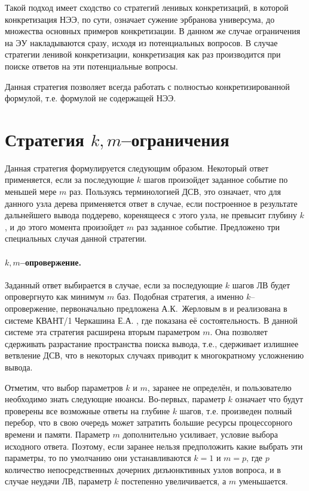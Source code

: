 Такой подход имеет сходство со стратегий ленивых конкретизаций, в которой конкретизация НЭЭ, по сути, означает сужение эрбранова универсума, до множества основных примеров конкретизации. В данном же случае ограничения на ЭУ накладываются сразу, исходя из потенциальных вопросов. В случае стратегии ленивой конкретизации, конкретизация как раз производится при поиске ответов на эти потенциальные вопросы.

Данная стратегия позволяет всегда работать с полностью конкретизированной формулой, т.е. формулой не содержащей НЭЭ.




\section{Стратегия $k,m$--ограничения}
Данная стратегия формулируется следующим образом. Некоторый ответ применяется, если за последующие $k$ шагов произойдет заданное событие по меньшей мере $m$ раз. Пользуясь терминологией ДСВ, это означает, что для данного узла дерева применяется ответ в случае, если построенное в результате дальнейшего вывода поддерево, коренящееся с этого узла, не превысит глубину $k$, и до этого момента произойдет $m$ раз заданное событие. Предложено три специальных случая данной стратегии.

\paragraph{$k,m$--опровержение.} Заданный ответ выбирается в случае, если за последующие $k$ шагов ЛВ будет опровергнуто как минимум $m$ баз. Подобная стратегия, а именно $k$--опровержение, первоначально предложена А.К.~Жерловым в \cite{ICDS2000} и реализована в системе КВАНТ/1 Черкашина Е.А. \cite{dissChe}, где показана её состоятельность. В данной системе эта стратегия расширена вторым параметром $m$. Она позволяет сдерживать разрастание пространства поиска вывода, т.е., сдерживает излишнее ветвление ДСВ, что в некоторых случаях приводит к многократному усложнению вывода.

Отметим, что выбор параметров $k$ и $m$, заранее не определён, и пользователю необходимо знать следующие нюансы. Во-первых, параметр $k$ означает что будут проверены все возможные ответы на глубине $k$ шагов, т.е. произведен полный перебор, что в свою очередь может затратить большие ресурсы процессорного времени и памяти. Параметр $m$ дополнительно усиливает, условие выбора исходного ответа. Поэтому, если заранее нельзя предположить какие выбрать эти параметры, то по умолчанию они устанавливаются $k=1$ и $m=p$, где $p$ количество непосредственных дочерних дизъюнктивных узлов вопроса, и в случае неудачи ЛВ, параметр $k$ постепенно увеличивается, а $m$ уменьшается.


